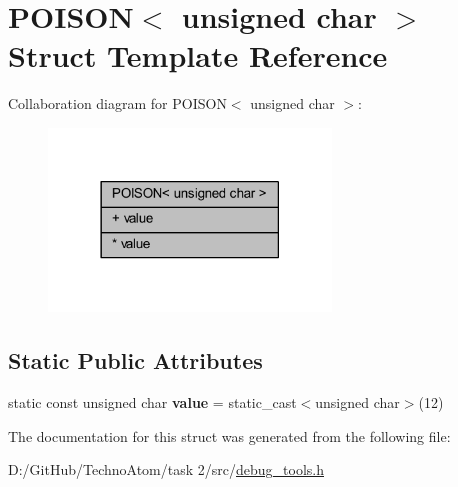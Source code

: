 \hypertarget{struct_p_o_i_s_o_n_3_01unsigned_01char_01_4}{}\section{P\+O\+I\+S\+ON$<$ unsigned char $>$ Struct Template Reference}
\label{struct_p_o_i_s_o_n_3_01unsigned_01char_01_4}


Collaboration diagram for P\+O\+I\+S\+ON$<$ unsigned char $>$\+:
\nopagebreak
\begin{figure}[H]
\begin{center}
\leavevmode
\includegraphics[width=213pt]{struct_p_o_i_s_o_n_3_01unsigned_01char_01_4__coll__graph}
\end{center}
\end{figure}
\subsection*{Static Public Attributes}
\textbf{ }\par
\begin{DoxyCompactItemize}
\item 
\mbox{\label{struct_p_o_i_s_o_n_3_01unsigned_01char_01_4_a7d966240ad6bf556979b7f6c8fecfd37}} 
static const unsigned char {\bfseries value} = static\+\_\+cast$<$unsigned char$>$(12)
\end{DoxyCompactItemize}



The documentation for this struct was generated from the following file\+:\begin{DoxyCompactItemize}
\item 
D\+:/\+Git\+Hub/\+Techno\+Atom/task 2/src/\hyperlink{debug__tools_8h}{debug\+\_\+tools.\+h}\end{DoxyCompactItemize}
